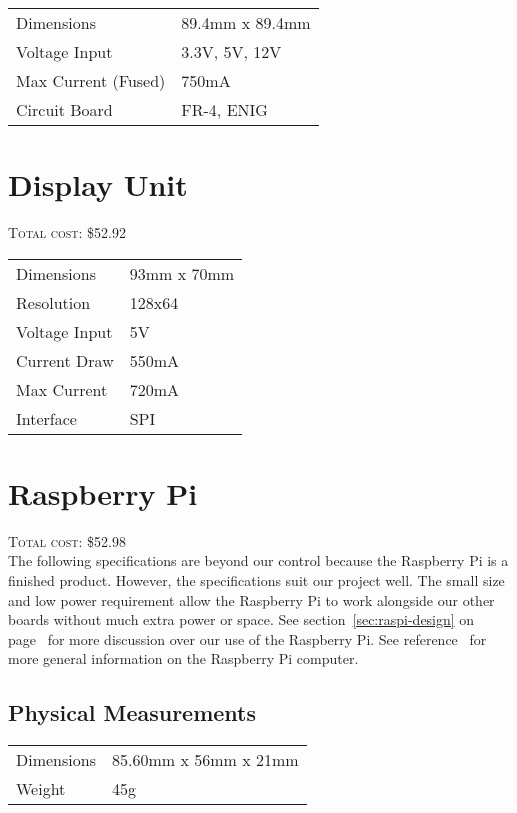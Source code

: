 \begin{tabular}{p{} p{}}
\hline
Dimensions & 89.4mm x 89.4mm \\
Voltage Input & 3.3V, 5V, 12V \\
Max Current (Fused) & 750mA \\
Circuit Board & FR-4, ENIG \\
\hline
\end{tabular}

\pagebreak

\section{Display Unit}
\textsc{Total cost: \$52.92} \\

\nopagebreak

\begin{tabular}{p{} p{}}
\hline
Dimensions & 93mm x 70mm \\
Resolution  & 128x64 \\
Voltage Input & 5V \\
Current Draw & 550mA \\
Max Current & 720mA \\
Interface & SPI \\
\hline
\end{tabular}

\section{Raspberry Pi}
\textsc{Total cost: \$52.98} \\

The following specifications are beyond our control because the Raspberry Pi
is a finished product. However, the specifications suit our project well. The
small size and low power requirement allow the Raspberry Pi to work alongside
our other boards without much extra power or space. See
section~\ref{sec:raspi-design} on page~\pageref{sec:raspi-design} for more
discussion over our use of the Raspberry Pi. See reference~\cite{raspifaq} for
more general information on the Raspberry Pi computer.

\subsection{Physical Measurements}

\begin{tabular}{p{} p{}}
\hline
Dimensions & 85.60mm x 56mm x 21mm \\
Weight & 45g \\ \hline
\end{tabular}

